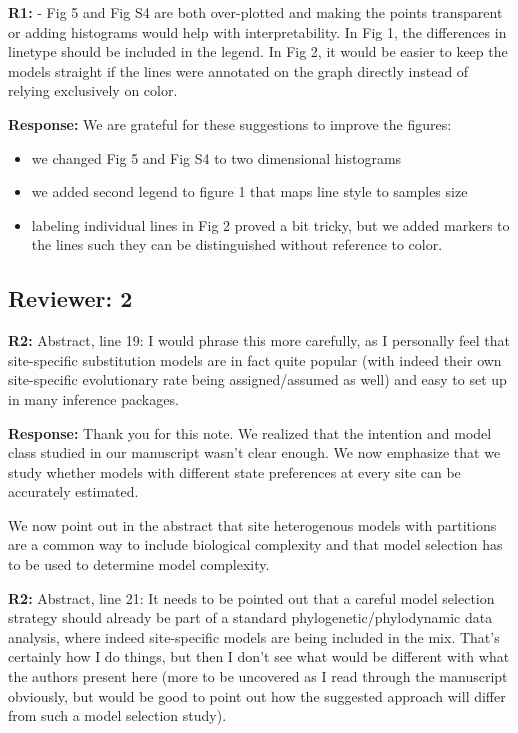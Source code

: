 \documentclass[aps,rmp,onecolumn]{revtex4-1}
\newcommand{\refa}[1]{\textbf{R1:} #1}
\newcommand{\refb}[1]{\textbf{R2:} #1}
\newcommand{\response}[1]{{\color{black}\textbf{Response:} #1}}
\begin{document}
\refa{- Fig 5 and Fig S4 are both over-plotted and making the points transparent or adding histograms would help with interpretability. In Fig 1, the differences in linetype should be included in the legend. In Fig 2, it would be easier to keep the models straight if the lines were annotated on the graph directly instead of relying exclusively on color.}

\response{
We are grateful for these suggestions to improve the figures:
\begin{itemize}
    \item we changed Fig 5 and Fig S4 to two dimensional histograms
    \item we added second legend to figure 1 that maps line style to samples size
    \item labeling individual lines in Fig 2 proved a bit tricky, but we added markers to the lines such they can be distinguished without reference to color.
\end{itemize}
}


\subsection*{Reviewer: 2}


\refb{Abstract, line 19: I would phrase this more carefully, as I personally feel that site-specific substitution models are in fact quite popular (with indeed their own site-specific evolutionary rate being assigned/assumed as well) and easy to set up in many inference packages.}

\response{Thank you for this note. We realized that the intention and model class studied in our manuscript wasn't clear enough. We now emphasize that we study whether models with different state preferences at every site can be accurately estimated.

We now point out in the abstract that site heterogenous models with partitions are a common way to include biological complexity and that model selection has to be used to determine model complexity.
 }

\refb{Abstract, line 21: It needs to be pointed out that a careful model selection strategy should already be part of a standard phylogenetic/phylodynamic data analysis, where indeed site-specific models are being included in the mix. That’s certainly how I do things, but then I don’t see what would be different with what the authors present here (more to be uncovered as I read through the manuscript obviously, but would be good to point out how the suggested approach will differ from such a model selection study).}
\end{document}
